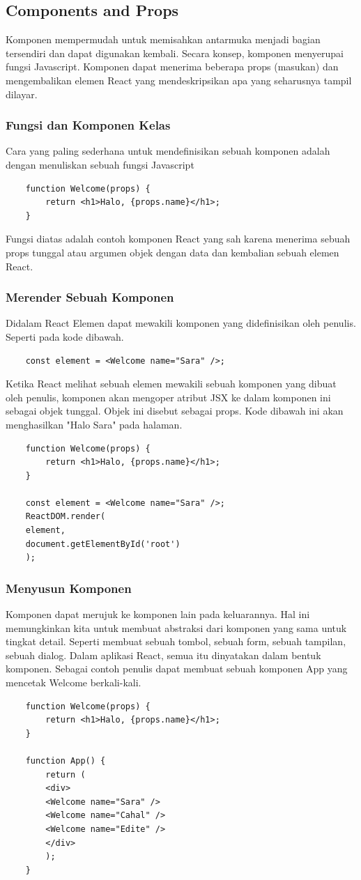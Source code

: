 \subsection{Components and Props}
Komponen mempermudah untuk memisahkan antarmuka menjadi bagian tersendiri dan dapat digunakan kembali. Secara konsep, komponen menyerupai fungsi Javascript. Komponen dapat menerima beberapa props (masukan) dan mengembalikan elemen React yang mendeskripsikan apa yang seharusnya tampil dilayar. 
\subsubsection{Fungsi dan Komponen Kelas}
Cara yang paling sederhana untuk mendefinisikan sebuah komponen adalah dengan menuliskan sebuah fungsi Javascript
\begin{lstlisting}
	function Welcome(props) {
		return <h1>Halo, {props.name}</h1>;
	}
\end{lstlisting}
Fungsi diatas adalah contoh komponen React yang sah karena menerima sebuah props tunggal atau argumen objek dengan data dan kembalian sebuah elemen React. 

\subsubsection{Merender Sebuah Komponen}
Didalam React Elemen dapat mewakili komponen yang didefinisikan oleh penulis. Seperti pada kode dibawah.
\begin{lstlisting}
	const element = <Welcome name="Sara" />;
\end{lstlisting}
Ketika React melihat sebuah elemen mewakili sebuah komponen yang dibuat oleh penulis, komponen akan mengoper atribut JSX ke dalam komponen ini sebagai objek tunggal. Objek ini disebut sebagai props. Kode dibawah ini akan menghasilkan "Halo Sara" pada halaman.
\begin{lstlisting}
	function Welcome(props) {
		return <h1>Halo, {props.name}</h1>;
	}
	
	const element = <Welcome name="Sara" />;
	ReactDOM.render(
	element,
	document.getElementById('root')
	);
\end{lstlisting} 

\subsubsection{Menyusun Komponen}
Komponen dapat merujuk ke komponen lain pada keluarannya. Hal ini memungkinkan kita untuk membuat abstraksi dari komponen yang sama untuk tingkat detail. Seperti membuat sebuah tombol, sebuah form, sebuah tampilan, sebuah dialog. Dalam aplikasi React, semua itu dinyatakan dalam bentuk komponen. Sebagai contoh penulis dapat membuat sebuah komponen App yang mencetak Welcome berkali-kali.
\begin{lstlisting}
	function Welcome(props) {
		return <h1>Halo, {props.name}</h1>;
	}
	
	function App() {
		return (
		<div>
		<Welcome name="Sara" />
		<Welcome name="Cahal" />
		<Welcome name="Edite" />
		</div>
		);
	}
\end{lstlisting}

